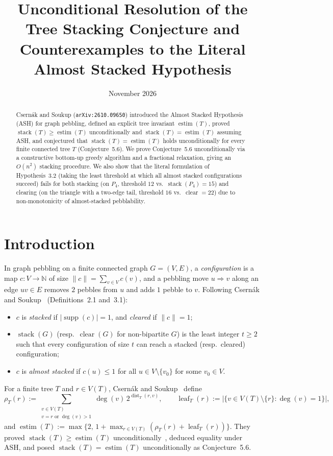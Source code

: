 \documentclass[11pt]{article}
\title{Unconditional Resolution of the Tree Stacking Conjecture and Counterexamples to the Literal Almost Stacked Hypothesis}
\author{}
\date{November 2026}
\DeclareMathOperator{\stack}{stack}
\DeclareMathOperator{\clear}{clear}
\DeclareMathOperator{\estim}{estim}
\DeclareMathOperator{\supp}{supp}
\DeclareMathOperator{\dist}{dist}
\DeclareMathOperator{\leaf}{leaf}
\begin{document}
\maketitle

\begin{abstract}
Csern\'ak and Soukup (\texttt{arXiv:2610.09650}) introduced the Almost Stacked Hypothesis (ASH) for graph pebbling, defined an explicit tree invariant $\estim(T)$, proved $\stack(T) \ge \estim(T)$ unconditionally and $\stack(T) = \estim(T)$ assuming ASH, and conjectured that $\stack(T) = \estim(T)$ holds unconditionally for every finite connected tree $T$ (Conjecture~5.6). We prove Conjecture~5.6 unconditionally via a constructive bottom-up greedy algorithm and a fractional relaxation, giving an $O(n^2)$ stacking procedure. We also show that the literal formulation of Hypothesis~3.2 (taking the least threshold at which all almost stacked configurations succeed) fails for both stacking (on $P_4$, threshold $12$ vs.\ $\stack(P_4)=15$) and clearing (on the triangle with a two-edge tail, threshold $16$ vs.\ $\clear=22$) due to non-monotonicity of almost-stacked pebblability.
\end{abstract}

\section{Introduction}

In graph pebbling on a finite connected graph $G = (V, E)$, a \emph{configuration} is a map $c : V \to \mathbb{N}$ of size $\|c\| = \sum_{v \in V} c(v)$, and a pebbling move $u \Rightarrow v$ along an edge $uv \in E$ removes $2$ pebbles from $u$ and adds $1$ pebble to $v$. Following Csern\'ak and Soukup~\cite{CS26} (Definitions~2.1 and~3.1):
\begin{itemize}
  \item $c$ is \emph{stacked} if $|\supp(c)| = 1$, and \emph{cleared} if $\|c\| = 1$;
  \item $\stack(G)$ (resp.\ $\clear(G)$ for non-bipartite $G$) is the least integer $t \ge 2$ such that every configuration of size $t$ can reach a stacked (resp.\ cleared) configuration;
  \item $c$ is \emph{almost stacked} if $c(u) \le 1$ for all $u \in V \setminus \{v_0\}$ for some $v_0 \in V$.
\end{itemize}

For a finite tree $T$ and $r \in V(T)$, Csern\'ak and Soukup~\cite[Definition~5.1]{CS26} define
\[
\rho_T(r) := \sum_{\substack{v \in V(T) \\ v = r \text{ or } \deg(v) > 1}} \deg(v) \, 2^{\dist_T(r,v)}, \qquad
\leaf_T(r) := |\{v \in V(T) \setminus \{r\} : \deg(v) = 1\}|,
\]
and $\estim(T) := \max\bigl\{2,\, 1 + \max_{r \in V(T)}(\rho_T(r) + \leaf_T(r))\bigr\}$. They proved $\stack(T) \ge \estim(T)$ unconditionally~\cite[Theorem~5.2]{CS26}, deduced equality under ASH, and posed $\stack(T) = \estim(T)$ unconditionally as Conjecture~5.6.
\end{document}
